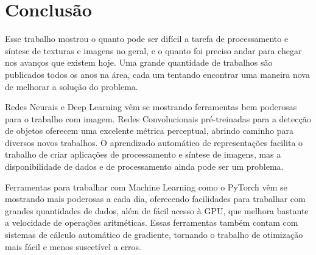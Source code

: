 \chapter{Conclusão}

Esse trabalho mostrou o quanto
pode ser difícil a tarefa de
processamento e síntese
de texturas e imagens no geral,
e o quanto foi preciso andar
para chegar nos avanços que
existem hoje.
Uma grande quantidade de trabalhos
são publicados todos os anos
na área, cada um tentando
encontrar uma maneira nova de
melhorar a solução do problema.

Redes Neurais e Deep Learning
vêm se mostrando ferramentas
bem poderosas para o trabalho com imagem.
Redes Convolucionais pré-treinadas
para a detecção de objetos
oferecem uma excelente métrica
perceptual, abrindo caminho para
diversos novos trabalhos.
O aprendizado automático
de representações facilita
o trabalho de criar aplicações
de processamento e síntese de imagens,
mas a disponibilidade de dados
e de processamento ainda pode ser
um problema.



Ferramentas para trabalhar
com Machine Learning como o
PyTorch vêm se mostrando
mais poderosas
a cada dia, oferecendo
facilidades para trabalhar 
com grandes quantidades de dados,
além de fácil acesso à GPU,
que melhora bastante a velocidade
de operações aritméticas.
Essas ferramentas também 
contam com sistemas de cálculo automático
de gradiente, tornando o trabalho
de otimização mais fácil e
menos suscetível a erros.







